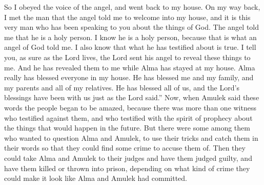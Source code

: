 So I obeyed the voice of the angel, and went back to my house. On my way back, I met the man that the angel told me to welcome into my house, and it is this very man who has been speaking to you about the things of God.
\bverse \iffalse And the angel said unto me he is a holy man; wherefore I know he is a holy man because it was said by an angel of God. \fi
The angel told me that he is a holy person. I know he is a holy person, because that is what an angel of God told me.
\bverse \iffalse And again, I know that the things whereof he hath testified are true; for behold I say unto you, that as the Lord liveth, even so has he sent his angel to make these things manifest unto me; and this he has done while this Alma hath dwelt at my house. \fi
I also know that what he has testified about is true. I tell you, as sure as the Lord lives, the Lord sent his angel to reveal these things to me. And he has revealed them to me while Alma has stayed at my house.
\bverse \iffalse For behold, he hath blessed mine house, he hath blessed me, and my women, and my children, and my father and my kinsfolk; yea, even all my kindred hath he blessed, and the blessing of the Lord hath rested upon us according to the words which he spake. \fi
Alma really has blessed everyone in my house. He has blessed me and my family, and my parents and all of my relatives. He has blessed all of us, and the Lord's blessings have been with us just as the Lord said.''
\bverse \iffalse And now, when Amulek had spoken these words the people began to be astonished, seeing there was more than one witness who testified of the things whereof they were accused, and also of the things which were to come, according to the spirit of prophecy which was in them. \fi
Now, when Amulek said these words the people began to be amazed, because there was more than one witness who testified against them, and who testified with the spirit of prophecy about the things that would happen in the future.
\bverse \iffalse Nevertheless, there were some among them who thought to question them, that by their cunning devices they might catch them in their words, that they might find witness against them, that they might deliver them to their judges that they might be judged according to the law, and that they might be slain or cast into prison, according to the crime which they could make appear or witness against them. \fi
But there were some among them who wanted to question Alma and Amulek, to use their tricks and catch them in their words so that they could find some crime to accuse them of. Then they could take Alma and Amulek to their judges and have them judged guilty, and have them killed or thrown into prison, depending on what kind of crime they could make it look like Alma and Amulek had committed.
